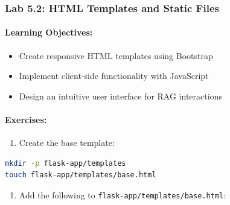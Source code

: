 \documentclass[
  screen,review,acmlarge]{acmart}
\newcommand{\passthrough}[1]{#1}
\providecommand{\tightlist}{%
  \setlength{\itemsep}{0pt}\setlength{\parskip}{0pt}}
\begin{document}
\subsubsection{Lab 5.2: HTML Templates and Static Files}\label{lab-5.2-html-templates-and-static-files}

\paragraph{Learning Objectives:}\label{learning-objectives-6}

\begin{itemize}
\tightlist
\item
  Create responsive HTML templates using Bootstrap
\item
  Implement client-side functionality with JavaScript
\item
  Design an intuitive user interface for RAG interactions
\end{itemize}

\paragraph{Exercises:}\label{exercises-5}

\begin{enumerate}
\def\labelenumi{\arabic{enumi}.}
\tightlist
\item
  Create the base template:
\end{enumerate}

\begin{lstlisting}[language=bash]
mkdir -p flask-app/templates
touch flask-app/templates/base.html
\end{lstlisting}

\begin{enumerate}
\def\labelenumi{\arabic{enumi}.}
\setcounter{enumi}{1}
\tightlist
\item
  Add the following to \passthrough{\lstinline!flask-app/templates/base.html!}:
\end{enumerate}
\end{document}

